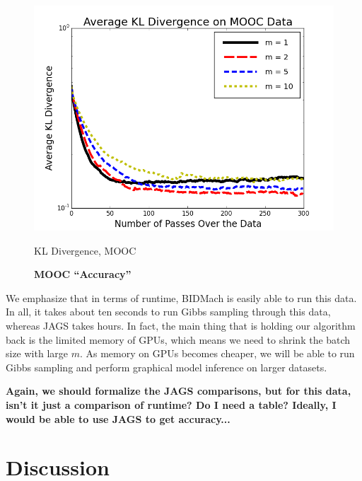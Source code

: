 \documentclass{article} %
\begin{document}
\begin{figure}[t]
  \centering
  \begin{minipage}{.5\textwidth}
    \centering
    \includegraphics[width=1\textwidth]{fig_mooc_kl_div.png}
    \caption{KL Divergence, MOOC}
    \label{fig:mooc_cpts}
  \end{minipage}\hfill
    \begin{minipage}{.5\textwidth}
    \centering
    \fbox{\rule[-.5cm]{0cm}{4cm} \rule[-.5cm]{4cm}{0cm}}
    \caption{\textbf{MOOC ``Accuracy''}}
    \label{fig:mooc_accuracy}
  \end{minipage}
\end{figure}

We emphasize that in terms of runtime, BIDMach is easily able to run this data. In all, it takes
about ten seconds to run Gibbs sampling through this data, whereas JAGS takes hours. In fact, the
main thing that is holding our algorithm back is the limited memory of GPUs, which means we need to
shrink the batch size with large $m$. As memory on GPUs becomes cheaper, we will be able to run
Gibbs sampling and perform graphical model inference on larger datasets.

\textbf{Again, we should formalize the JAGS comparisons, but for this data, isn't it just a
comparison of runtime? Do I need a table? Ideally, I would be able to use JAGS to get accuracy...}




\section{Discussion}\label{sec:discussion}
\end{document}
